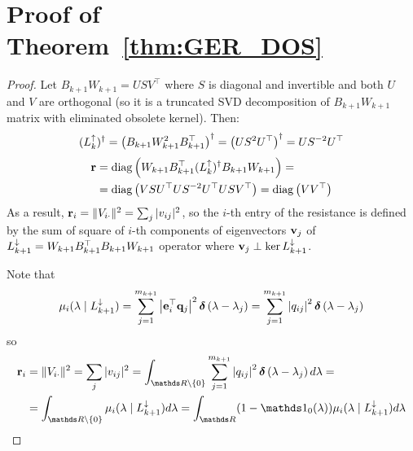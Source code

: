 




\section{Proof of Theorem~\ref{thm:GER_DOS} }

\begin{proof}
      Let \( B_{k+1} W_{k+1} = U S V^\top\) where \( S \) is diagonal and invertible and both \( U \) and \( V \) are orthogonal (so it is a truncated SVD decomposition of \( B_{k+1} W_{k+1} \) matrix with eliminated obsolete kernel). Then:
      \begin{equation}
            ( L_{k}^{\uparrow} )^\dagger = \left( B_{k+1} W_{k+1}^2 B_{k+1}^\top \right)^\dagger = \left( U S^2 U^\top \right)^\dagger = U S^{-2} U^\top
      \end{equation}
      \begin{equation}
            \begin{aligned}
                  \mathbf{r} & = \operatorname{diag} \left( W_{k+1} B_{k+1}^\top ( L_{k}^{\uparrow} )^\dagger B_{k+1} W_{k+1} \right)  =  \\
                  & = \operatorname{diag} \left(  V S U^\top U S^{-2} U^\top U S V^\top \right) = \operatorname{diag} \left(  V V^\top \right)
            \end{aligned}
      \end{equation}
      As a result, \( \mathbf{r}_i = \| V_{ i \cdot } \|^2 = \sum_j | v_{ij} |^2  \), so the \(i\)-th entry of the resistance is defined by the sum of square of \(i\)-th components of eigenvectors \( \mathbf{v}_j \) of \( L_{k+1}^{\downarrow} = W_{k+1} B_{k+1}^\top B_{k+1} W_{k+1} \) operator where \( \mathbf{v}_j \perp \ker L_{k+1}^{\downarrow} \).

      Note that 
      \begin{equation}
            \mu_i ( \lambda \mid L_{k+1}^{\downarrow} ) = \sum_{j=1}^{m_{k+1}} \left| \mathbf{e}_i^\top \mathbf{q}_j \right|^2 \bm\delta \left( \lambda - \lambda_j \right)  = \sum_{j=1}^{m_{k+1}} \left| q_{ij} \right|^2 \bm\delta \left( \lambda - \lambda_j \right) 
      \end{equation}
      so 
      \begin{equation}
            \begin{aligned}
                  \b r_i & = \| V_{ i \cdot } \|^2 = \sum_j | v_{ij} |^2 = \int_{ \ds R \backslash \{ 0 \} }  \sum_{j=1}^{m_{k+1}} \left| q_{ij} \right|^2 \bm\delta \left( \lambda - \lambda_j \right)  d\lambda =\\
                  & = \int_{ \ds R \backslash \{ 0 \} } \mu_i ( \lambda \mid \Ld {k+1} ) d\lambda = \int_{\ds R } (1 - \ds 1_0(\lambda)) \mu_i ( \lambda \mid \Ld {k+1} ) d\lambda
            \end{aligned}
      \end{equation}
\end{proof}


